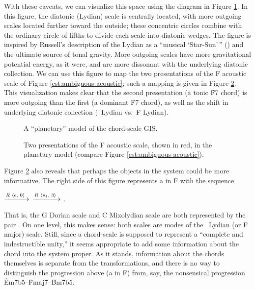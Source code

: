 With these caveats, we can visualize this space using the diagram in Figure
\ref{cst:polar-gis}. In this figure, the diatonic (Lydian) scale is centrally
located, with more outgoing scales located further toward the outside; these
concentric circles combine with the ordinary circle of fifths to divide each
scale into diatonic wedges. The figure is inspired by Russell's
description of the Lydian as a ``musical `Star-Sun'\,'' () and the
ultimate source of tonal gravity. More outgoing scales have more gravitational
potential energy, as it were, and are more dissonant with the underlying
diatonic collection. We can use this figure to map the two presentations of
the F acoustic scale of Figure \ref{cst:ambiguous-acoustic}; such a mapping is
given in Figure \ref{cst:polar-acoustic}. This visualization makes clear that
the second presentation (a tonic \h{F7} chord) is more outgoing than the first
(a dominant \h{F7} chord), as well as the shift in underlying diatonic
collection (\Eflat\ Lydian vs.\ F Lydian).

\begin{figure}[tbp]
  \caption{A ``planetary'' model of the chord-scale \textsc{GIS}.}
  \label{cst:polar-gis}
\end{figure}

\begin{figure}[tbp]
  \caption[Two presentations of the F acoustic scale in the planetary
  model.]{Two presentations of the F acoustic scale, shown in red, in the
    planetary model (compare Figure \ref{cst:ambiguous-acoustic}).}
  \label{cst:polar-acoustic}
\end{figure}

Figure \ref{cst:polar-acoustic} also reveals that perhaps the objects in the
system could be more informative. The right side of this figure represents a
\tfo in F with the sequence \\
{ \centering
   $\xrightarrow{R\text{ \mbox{\ensuremath{\langle}$e$, $0$\ensuremath{\rangle}} }}$
   $\xrightarrow{R\text{ \mbox{\ensuremath{\langle}$s_1$, $3$\ensuremath{\rangle}} }}$
  .
  \par
}
\noindent That is, the G Dorian scale and C Mixolydian scale are both
represented by the pair . On one level, this makes
sense: both scales are modes of the \Bflat\ Lydian (or F major) scale. Still,
since a chord-scale is supposed to represent a ``complete and indestructible
unity,'' it seems appropriate to add some information about the chord into the
system proper. As it stands, information about the chords themselves is
separate from the transformations, and there is no way to distinguish the
progression above (a \tfo in F) from, say, the nonsensical progression
\mbox{\h{Em7b5}--\h{Fmaj7}--\h{Bm7b5}}.


